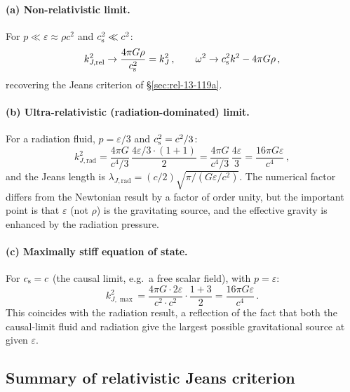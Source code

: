 \paragraph{(a) Non-relativistic limit.}
For $p \ll \varepsilon \approx \rho c^{2}$ and
$c_{\mathrm{s}}^{2} \ll c^{2}$:
\begin{equation}
  k_{J,\mathrm{rel}}^{2}
  \to \frac{4\pi G\rho}{c_{\mathrm{s}}^{2}}
  = k_{J}^{2}\,,
  \qquad
  \omega^{2}
  \to c_{\mathrm{s}}^{2}k^{2} - 4\pi G\rho\,,
\end{equation}
recovering the Jeans criterion of \S\ref{sec:rel-13-119a}.

\paragraph{(b) Ultra-relativistic (radiation-dominated) limit.}
For a radiation fluid, $p = \varepsilon/3$ and
$c_{\mathrm{s}}^{2} = c^{2}/3$:
\begin{equation}
\label{eq:rel-13-radiation}
  k_{J,\mathrm{rad}}^{2}
  = \frac{4\pi G}{c^{4}/3}\,
    \frac{4\varepsilon/3 \cdot (1+1)}{2}
  = \frac{4\pi G}{c^{4}/3}\,\frac{4\varepsilon}{3}
  = \frac{16\pi G\varepsilon}{c^{4}}\,,
\end{equation}
and the Jeans length is
$\lambda_{J,\mathrm{rad}} = (c/2)\sqrt{\pi/(G\varepsilon/c^{2})}$.
The numerical factor differs from the Newtonian result by a factor
of order unity, but the important point is that $\varepsilon$
(not $\rho$) is the gravitating source, and the effective gravity
is enhanced by the radiation pressure.

\paragraph{(c) Maximally stiff equation of state.}
For $c_{\mathrm{s}} = c$ (the causal limit, e.g.\ a free scalar field),
with $p = \varepsilon$:
\begin{equation}
  k_{J,\max}^{2}
  = \frac{4\pi G \cdot 2\varepsilon}{c^{2}\cdot c^{2}}
    \cdot \frac{1+3}{2}
  = \frac{16\pi G\varepsilon}{c^{4}}\,.
\end{equation}
This coincides with the radiation result, a reflection of the fact
that both the causal-limit fluid and radiation give the largest
possible gravitational source at given $\varepsilon$.

\subsection{Summary of relativistic Jeans criterion}
\label{sec:rel-13-119-summary}

